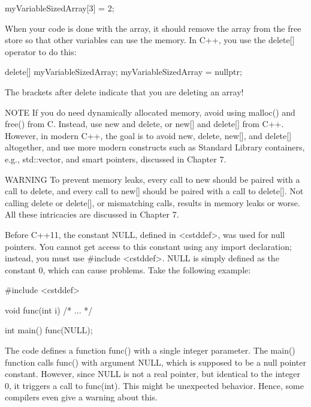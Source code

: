 \begin{cpp}
myVariableSizedArray[3] = 2;
\end{cpp}

When your code is done with the array, it should remove the array from the free store so that other variables can use the memory. In C++, you use the delete[] operator to do this:

\begin{cpp}
delete[] myVariableSizedArray;
myVariableSizedArray = nullptr;
\end{cpp}

The brackets after delete indicate that you are deleting an array!


\begin{myNotic}{NOTE}
If you do need dynamically allocated memory, avoid using malloc() and free() from C. Instead, use new and delete, or new[] and delete[] from C++. However, in modern C++, the goal is to avoid new, delete, new[], and delete[] altogether, and use more modern constructs such as Standard Library containers, e.g., std::vector, and smart pointers, discussed in Chapter 7.
\end{myNotic}

\begin{myWarning}{WARNING}
To prevent memory leaks, every call to new should be paired with a call to delete, and every call to new[] should be paired with a call to delete[]. Not calling delete or delete[], or mismatching calls, results in memory leaks or worse. All these intricacies are discussed in Chapter 7.
\end{myWarning}


Before C++11, the constant NULL, defined in <cstddef>, was used for null pointers. You cannot get access to this constant using any import declaration; instead, you must use \#include <cstddef>. NULL is simply defined as the constant 0, which can cause problems. Take the following example:

\begin{cpp}
#include <cstddef>

void func(int i) { /* ... */ }

int main()
{
    func(NULL);
}
\end{cpp}

The code defines a function func() with a single integer parameter. The main() function calls func() with argument NULL, which is supposed to be a null pointer constant. However, since NULL is not a real pointer, but identical to the integer 0, it triggers a call to func(int). This might be unexpected behavior. Hence, some compilers even give a warning about this.

